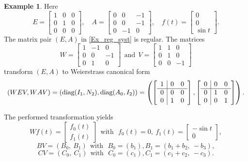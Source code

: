 \documentclass[preprint,12pt]{elsarticle}
\numberwithin{equation}{section}
\theoremstyle{definition}
\newtheorem{example}[theorem]{Example}
\begin{document}
\begin{example}
Here 
\begin{equation*}
    E=\begin{bmatrix}
        1 & 0 & 0\\ 0 & 1 & 0 \\ 0 & 0 & 0
    \end{bmatrix},\quad A=\begin{bmatrix}
        0 & 0 & -1\\ 0 & 0 & -1 \\ 0 & -1 & 0
    \end{bmatrix}, \quad f(t)=\begin{bmatrix}
        0 \\ 0 \\ \sin t
    \end{bmatrix}.
\end{equation*}
    The matrix pair
$(E,A)$ in \eqref{Ex_reg_syst} is regular. The matrices 
\begin{equation*}
    W=\begin{bmatrix}
        1 & -1 & 0\\ 0 & 0 & -1 \\ 0 & 1 & 0
    \end{bmatrix}~~ \text{and} ~~V=\begin{bmatrix}
        1 & 1 & 0\\ 0 & 1 & 0 \\ 0 & 0 & -1
    \end{bmatrix} 
\end{equation*}
transform $(E,A)$ to Weierstrass canonical form
\begin{equation*}
    (WEV,WAV)=(\text{diag}(I_1, N_2),\text{diag}(A_0, I_2))= \left(\left[\begin{array}{c|c c}
        1 & 0 & 0\\ \hline 0 & 0 & 0 \\ 0 & 1 & 0
    \end{array}\right], \left[\begin{array}{c|c c}
        0 & 0 & 0\\\hline 0 & 1 & 0 \\ 0 & 0 & 1
    \end{array} \right]\right).
\end{equation*}
       

The performed transformation yields
\begin{equation*}
    Wf(t)=\begin{bmatrix}
        f_0(t)\\ f_1(t)
    \end{bmatrix} ~~\text{with} ~~~f_0(t)=0,~ f_1(t)=\begin{bmatrix}
        -\sin t\\ 0 \end{bmatrix},
\end{equation*}
\begin{equation*}
    BV=(B_0,~B_1)~~\text{with} ~~~B_0=(b_1), B_1=(b_1+b_2,~-b_3),
\end{equation*}
\begin{equation*}
    CV=(C_0,~C_1)~~\text{with} ~~~C_0=(c_1), C_1=(c_1+c_2,~-c_3).
\end{equation*}


\end{example}
\end{document}
